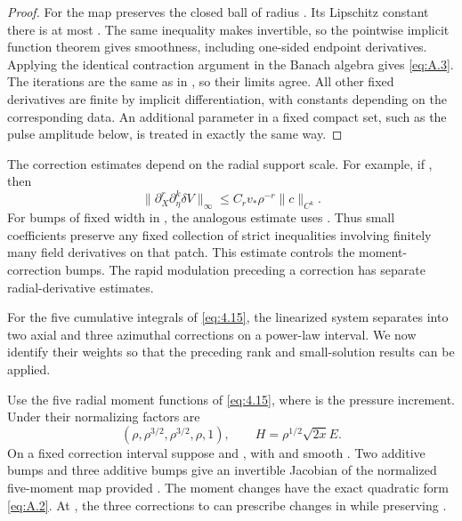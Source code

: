 \begin{proof}
For  the map
 preserves the closed
 ball of radius . Its Lipschitz constant there is
at most . The same inequality makes
 invertible, so the pointwise implicit function theorem gives
smoothness, including one-sided endpoint derivatives. Applying the identical contraction argument
in the Banach algebra
%
 gives \eqref{eq:A.3}. The iterations are the same as in
, so their limits agree. All other fixed derivatives are finite by
implicit differentiation, with constants depending on the corresponding data. An additional
parameter in a fixed compact set, such as the pulse amplitude below, is treated in exactly the same
way.
\end{proof}

The correction estimates depend on the radial support scale. For example, if
, then
\[
\lVert\partial_X^r\partial_\eta^k\delta V\rVert_\infty
\le C_rv_*\rho^{-r}\lVert c\rVert_{C^k}.
\]
For bumps of fixed width in , the analogous estimate uses
. Thus small coefficients preserve any fixed collection of
strict inequalities involving finitely many field derivatives on that patch. This estimate controls
the moment-correction bumps. The rapid modulation preceding a correction has separate
radial-derivative estimates.

For the five cumulative integrals of \eqref{eq:4.15}, the linearized system separates into two axial
and three azimuthal corrections on a power-law interval. We now identify their weights so that the
preceding rank and small-solution results can be applied.

\begin{corollary}\label{cor:A.3}
Use the five radial moment functions  of \eqref{eq:4.15},
where  is the pressure increment. Under
 their normalizing factors are
\begin{equation}
(\rho,\rho^{3/2},\rho^{3/2},\rho,1),
\qquad H=\rho^{1/2}\sqrt{2x}E.
\tag{A.4}\label{eq:A.4}
\end{equation}
On a fixed correction interval suppose  and
, with
 and smooth . Two additive
 bumps and three additive  bumps give an
invertible Jacobian of the normalized five-moment map provided
. The moment changes have the exact
quadratic form \eqref{eq:A.2}. At , the three corrections to
 can prescribe changes in  while
preserving .
\end{corollary}

